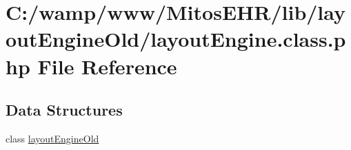 \hypertarget{layout_engine_8class_8php}{\section{\-C\-:/wamp/www/\-Mitos\-E\-H\-R/lib/layout\-Engine\-Old/layout\-Engine.class.\-php \-File \-Reference}
\label{layout_engine_8class_8php}
}
\subsection*{\-Data \-Structures}
\begin{DoxyCompactItemize}
\item 
class \hyperlink{classlayout_engine_old}{layout\-Engine\-Old}
\end{DoxyCompactItemize}
